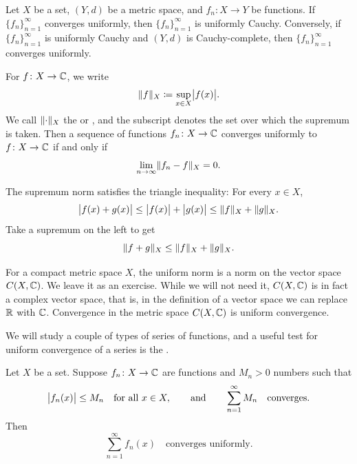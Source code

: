 \begin{prop} \label{prop:unifcauchymetric}
Let $X$ be a set, $(Y,d)$ be a metric space, and
$f_n \colon X \to Y$ be functions.
If $\{ f_n \}_{n=1}^\infty$ converges uniformly,
then $\{f_n\}_{n=1}^\infty$ is uniformly Cauchy.  Conversely, if 
$\{f_n\}_{n=1}^\infty$ is uniformly Cauchy and $(Y,d)$ is Cauchy-complete,
then $\{f_n\}_{n=1}^\infty$ converges uniformly.
\end{prop}

For $f \colon X \to {\mathbb{C}}$, we write
\begin{equation*}
\lVert {f} \rVert_X \coloneqq \sup_{x \in X} \bigl\lvert {f(x)} \bigr\rvert .
\end{equation*}
We call $\lVert {\cdot} \rVert_X$
the \emph{} or \emph{},
and the subscript denotes the set over which the supremum is taken.
Then a sequence of functions
$f_n \colon X \to {\mathbb{C}}$ converges uniformly to $f \colon X \to {\mathbb{C}}$ if and only if
\begin{equation*}
\lim_{n\to \infty} \lVert {f_n-f} \rVert_X = 0 .
\end{equation*}

The supremum norm satisfies the triangle inequality: For every $x \in X$,
\begin{equation*}
\bigl\lvert {f(x)+g(x)} \bigr\rvert \leq
\bigl\lvert {f(x)} \bigr\rvert+\bigl\lvert {g(x)} \bigr\rvert \leq
\lVert {f} \rVert_X+\lVert {g} \rVert_X .
\end{equation*}
Take a supremum on the left to get
\begin{equation*}
\lVert {f+g} \rVert_X \leq
\lVert {f} \rVert_X+\lVert {g} \rVert_X .
\end{equation*}

For a compact metric space $X$,
the uniform norm is a norm on the vector space $C(X,{\mathbb{C}})$.
We leave it as an exercise.
While we will not need it, $C(X,{\mathbb{C}})$ is in fact a complex
vector space, that is, in the definition of a vector space we can replace
${\mathbb{R}}$ with ${\mathbb{C}}$.
Convergence in the metric space $C(X,{\mathbb{C}})$ is
uniform convergence.

We will study a couple of types of series of functions, and
a useful test for uniform convergence of a series is the 
\emph{}.

\begin{thm} \label{thm:weiermtest}
Let $X$ be a set.
Suppose $f_n \colon X \to {\mathbb{C}}$ are functions and $M_n > 0$ numbers such
that
\begin{equation*}
\bigl\lvert {f_n(x)} \bigr\rvert\leq M_n \quad \text{for all } x \in X,
\qquad \text{and} \qquad
\sum_{n=1}^\infty M_n
\quad \text{converges}.
\end{equation*}
Then
\begin{equation*}
\sum_{n=1}^\infty f_n(x)
\quad \text{converges uniformly}.
\end{equation*}
\end{thm}

